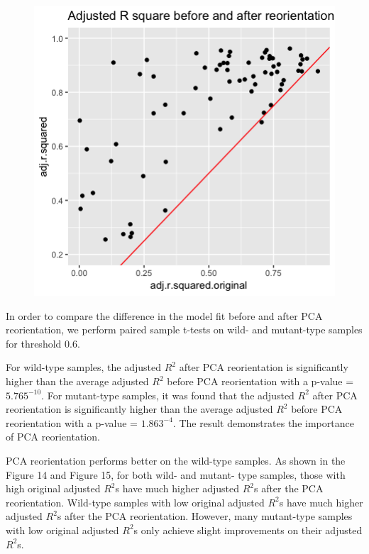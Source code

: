 \documentclass[10pt,letterpaper]{article}
\newenvironment{Shaded}{\begin{snugshade}}{\end{snugshade}}
\newcommand{\DataTypeTok}[1]{\textcolor[rgb]{0.13,0.29,0.53}{#1}}
\newcommand{\KeywordTok}[1]{\textcolor[rgb]{0.13,0.29,0.53}{\textbf{#1}}}
\newcommand{\NormalTok}[1]{#1}
\newcommand{\OperatorTok}[1]{\textcolor[rgb]{0.81,0.36,0.00}{\textbf{#1}}}
\newcommand{\OtherTok}[1]{\textcolor[rgb]{0.56,0.35,0.01}{#1}}
\newcommand{\StringTok}[1]{\textcolor[rgb]{0.31,0.60,0.02}{#1}}
\begin{document}
\begin{figure}[H]
\includegraphics[width=0.6\linewidth]{visualization_paper/adj_r2_before_after_yt} \end{figure}

In order to compare the difference in the model fit before and after PCA
reorientation, we perform paired sample t-tests on wild- and mutant-type
samples for threshold 0.6.

\begin{Shaded}
\end{Shaded}

For wild-type samples, the adjusted \(R^2\) after PCA reorientation is
significantly higher than the average adjusted \(R^2\) before PCA
reorientation with a p-value =\(5.765^{-10}\). For mutant-type samples,
it was found that the adjusted \(R^2\) after PCA reorientation is
significantly higher than the average adjusted \(R^2\) before PCA
reorientation with a p-value = \(1.863^{-4}\). The result demonstrates
the importance of PCA reorientation.

PCA reorientation performs better on the wild-type samples. As shown in
the Figure 14 and Figure 15, for both wild- and mutant- type samples,
those with high original adjusted \(R^2\)s have much higher adjusted
\(R^2\)s after the PCA reorientation. Wild-type samples with low
original adjusted \(R^2\)s have much higher adjusted \(R^2\)s after the
PCA reorientation. However, many mutant-type samples with low original
adjusted \(R^2\)s only achieve slight improvements on their adjusted
\(R^2\)s.
\end{document}
